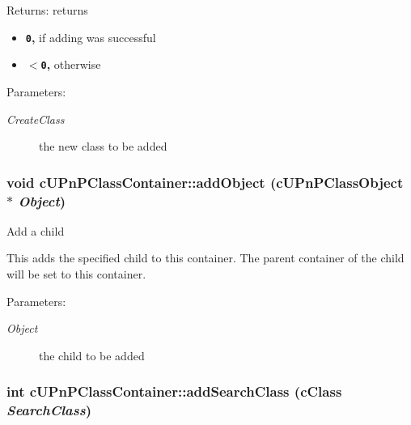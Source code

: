 \begin{Desc}
\item[Returns:]returns\begin{itemize}
\item {\bf {\tt 0},} if adding was successful\item {\bf {\tt $<$0},} otherwise \end{itemize}
\end{Desc}
\begin{Desc}
\item[Parameters:]
\begin{description}
\item[{\em CreateClass}]the new class to be added \end{description}
\end{Desc}
\hypertarget{classcUPnPClassContainer_589392682fb7c8e698d09b2eeca83887}{
\subsubsection[{addObject}]{\setlength{\rightskip}{0pt plus 5cm}void cUPnPClassContainer::addObject ({\bf cUPnPClassObject} $\ast$ {\em Object})}}
\label{classcUPnPClassContainer_589392682fb7c8e698d09b2eeca83887}


Add a child

This adds the specified child to this container. The parent container of the child will be set to this container.

\begin{Desc}
\item[Parameters:]
\begin{description}
\item[{\em Object}]the child to be added \end{description}
\end{Desc}
\hypertarget{classcUPnPClassContainer_d177af2487ff337fe79ef11fe1e07dd1}{
\subsubsection[{addSearchClass}]{\setlength{\rightskip}{0pt plus 5cm}int cUPnPClassContainer::addSearchClass ({\bf cClass} {\em SearchClass})}}
\label{classcUPnPClassContainer_d177af2487ff337fe79ef11fe1e07dd1}


